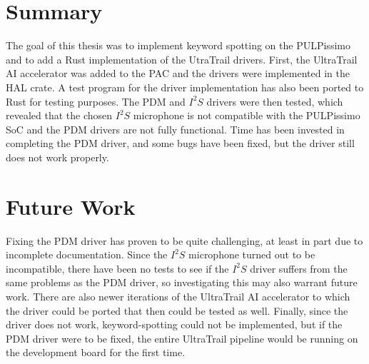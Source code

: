 
\section{Summary}

The goal of this thesis was to implement keyword spotting on the PULPissimo and to add a Rust implementation of the UtraTrail drivers.
First, the UltraTrail AI accelerator was added to the PAC and the drivers were implemented in the HAL crate.
A test program for the driver implementation has also been ported to Rust for testing purposes.
The PDM and $I^2S$ drivers were then tested, which revealed that the chosen $I^2S$
microphone is not compatible with the PULPissimo SoC and the PDM drivers are not fully functional.
Time has been invested in completing the PDM driver, and some bugs have been fixed, but the driver still does not work properly.

\section{Future Work}

Fixing the PDM driver has proven to be quite challenging, at least in part due to incomplete documentation.
Since the $I^2S$ microphone turned out to be incompatible, there have been no tests to see if the $I^2S$
driver suffers from the same problems as the PDM driver, so investigating this may also warrant future work.
There are also newer iterations of the UltraTrail AI accelerator to which the driver could be ported
that then could be tested as well.
Finally, since the driver does not work, keyword-spotting could not be implemented,
but if the PDM driver were to be fixed, the entire UltraTrail pipeline would be running on the development board for the first time.
